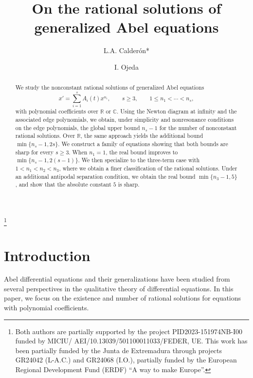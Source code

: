 \documentclass[12pt,a4paper]{amsart}
\title{On the rational solutions of generalized Abel equations}
\author{L.A. Calder\'on*}
\author{I. Ojeda}
\numberwithin{theorem}{section}
\theoremstyle{definition}
\begin{document}
	
	\begin{abstract}
		We study the nonconstant rational solutions of generalized Abel equations
		\[
		x'=\sum_{i=1}^s A_i(t)x^{n_i},\qquad s\geq3,\qquad 1\leq n_1<\cdots<n_s,
		\]
		with polynomial coefficients over $\mathbb{R}$ or $\mathbb{C}$. Using the Newton diagram at infinity and the associated edge polynomials, we obtain, under simplicity and nonresonance conditions on the edge polynomials, the global upper bound $n_s-1$ for the number of nonconstant rational solutions. Over $\mathbb{R}$, the same approach yields the additional bound $\min\{n_s-1,2s\}$. We construct a family of equations showing that both bounds are sharp for every $s\geq3$. When $n_1=1$, the real bound improves to $\min\{n_s-1,2(s-1)\}$. We then specialize to the three-term case with $1<n_1<n_2<n_3$, where we obtain a finer classification of the rational solutions. Under an additional antipodal separation condition, we obtain the real bound $\min\{n_3-1,5\}$, and show that the absolute constant $5$ is sharp.
	\end{abstract}
	
	
	
	\thanks{
		Both authors are partially supported by the project PID2023-151974NB-I00 funded by MICIU/
		AEI/10.13039/501100011033/FEDER, UE. This work has been partially funded by the Junta de Extremadura through projects GR24042 (L-A.C.) and GR24068 (I.O.), partially funded by the European Regional Development Fund (ERDF) ``A way to make Europe''.}
	
	\maketitle
	
	\section{Introduction}
	
	Abel differential equations and their generalizations have been studied from several perspectives in the qualitative theory of differential equations. In this paper, we focus on the existence and number of rational solutions for equations with polynomial coefficients.
	
\end{document}
